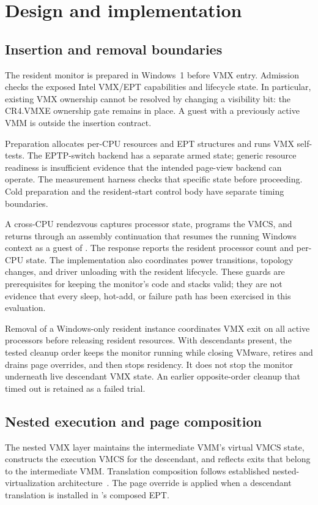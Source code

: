 \section{Design and implementation}
\label{sec:design}
\subsection{Insertion and removal boundaries}
The resident monitor is prepared in Windows~1 before VMX entry. Admission checks
the exposed Intel VMX/EPT capabilities and lifecycle state. In particular,
existing VMX ownership cannot be resolved by changing a visibility bit: the
CR4.VMXE ownership gate remains in place. A guest with a previously active VMM
is outside the insertion contract.

Preparation allocates per-CPU resources and EPT structures and runs VMX
self-tests. The EPTP-switch backend has a separate armed state; generic resource
readiness is insufficient evidence that the intended page-view backend can
operate. The measurement harness checks that specific state before proceeding.
Cold preparation and the resident-start control body have separate timing
boundaries.

A cross-CPU rendezvous captures processor state, programs the VMCS, and returns
through an assembly continuation that resumes the running Windows context as a
guest of \ks{}. The response reports the resident processor count and per-CPU
state. The implementation also coordinates power transitions, topology changes,
and driver unloading with the resident lifecycle. These guards are prerequisites
for keeping the monitor's code and stacks valid; they are not evidence that
every sleep, hot-add, or failure path has been exercised in this evaluation.

Removal of a Windows-only resident instance coordinates VMX exit on all active
processors before releasing resident resources. With descendants present, the
tested cleanup order keeps the monitor running while closing VMware, retires
and drains page overrides, and then stops residency. It does not stop the
monitor underneath live descendant VMX state. An earlier opposite-order cleanup
that timed out is retained as a failed trial.

\subsection{Nested execution and page composition}
The nested VMX layer maintains the intermediate VMM's virtual VMCS state,
constructs the execution VMCS for the descendant, and reflects exits that
belong to the intermediate VMM. Translation composition follows established
nested-virtualization architecture~\cite{turtles}. The page override is applied
when a descendant translation is installed in \ks{}'s composed EPT.

